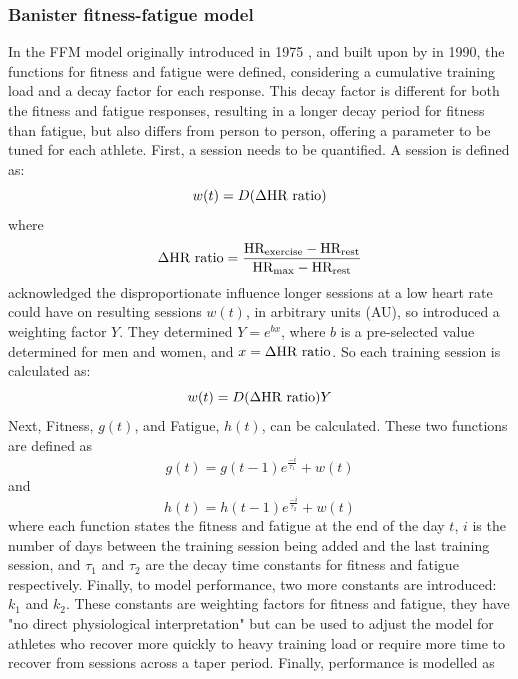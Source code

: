 \subsubsection{Banister fitness-fatigue model}
 In the FFM model originally introduced in 1975 \cite{Bannister1976}, and built upon by \textcite{Morton1990} in 1990, the functions for fitness and fatigue were defined, considering a cumulative training load and a decay factor for each response. This decay factor is different for both the fitness and fatigue responses, resulting in a longer decay period for fitness than fatigue, but also differs from person to person, offering a parameter to be tuned for each athlete. First, a session needs to be quantified. A session is defined as:
\begin{equation}\label{eq:ban_imp_base}
  w(t) = D (\Delta \textnormal{HR ratio})
\end{equation}
where
\begin{equation*}
  \Delta \textnormal{HR ratio} = \frac{\textnormal{HR}_\textnormal{exercise} - \textnormal{HR}_\textnormal{rest}}{\textnormal{HR}_\textnormal{max} - \textnormal{HR}_\textnormal{rest}}
\end{equation*}
\textcite{Morton1990} acknowledged the disproportionate influence longer sessions at a low heart rate could have on resulting sessions $w(t)$, in arbitrary units (AU), so introduced a weighting factor $Y$. They determined $Y = e^{bx}$, where $b$ is a pre-selected value determined for men and women, and $x = \Delta \textnormal{HR ratio}$. So each training session is calculated as:
\begin{equation}\label{eq:ban_impulse}
  w(t) = D (\Delta \textnormal{HR ratio})Y
\end{equation}
Next, Fitness, $g(t)$, and Fatigue, $h(t)$, can be calculated. These two functions are defined as
\begin{equation}\label{eq:ban_fit}
  g(t) = g(t - 1)e^\frac{-i}{\tau_1} + w(t)
\end{equation}
and
\begin{equation}\label{eq:ban_fat}
  h(t) = h(t - 1)e^\frac{-i}{\tau_2} + w(t)
\end{equation}
where each function states the fitness and fatigue at the end of the day $t$, $i$ is the number of days between the training session being added and the last training session, and $\tau_1$ and $\tau_2$ are the decay time constants for fitness and fatigue respectively. Finally, to model performance, two more constants are introduced: $k_1$ and $k_2$. These constants are weighting factors for fitness and fatigue, they have "no direct physiological interpretation" \cite{Morton1990} but can be used to adjust the model for athletes who recover more quickly to heavy training load or require more time to recover from sessions across a taper period. Finally, performance is modelled as
